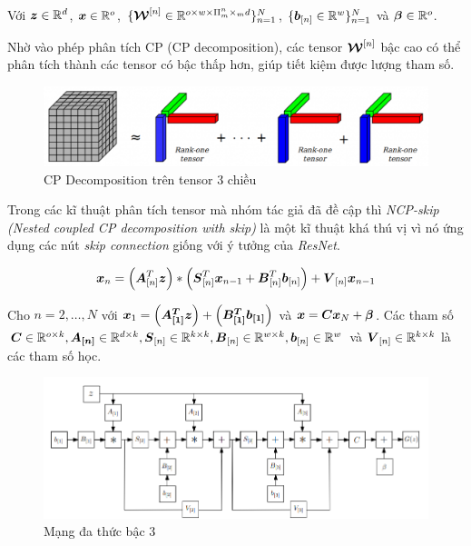 \documentclass[a4paper, 12pt]{article}
\begin{document}
Với $\vb*{z} \in \mathbb{R}^d$, $\vb*{x} \in \mathbb{R}^o$, $\{\vb*{\mathcal{W}}^{[n]} \in \mathbb{R}^{o \times w \times \Pi_m^n\times_m d}\}_{n=1}^N$, $\{\vb*{b}_{[n]} \in \mathbb{R}^{w}\}_{n=1}^{N}$ và $\vb*{\beta} \in \mathbb{R}^o$.

Nhờ vào phép phân tích CP (CP decomposition), các tensor $\vb*{\mathcal{W}}^{[n]}$ bậc cao có thể phân tích thành các tensor có bậc thấp hơn, giúp tiết kiệm được lượng tham số.

\begin{figure}[H]
    \begin{center}
        \includegraphics[scale=0.4]{img/cp-decomposition}
        \caption{CP Decomposition trên tensor 3 chiều}
    \end{center}
\end{figure}

Trong các kĩ thuật phân tích tensor mà nhóm tác giả đã đề cập thì \textit{NCP-skip (Nested coupled CP decomposition with skip)} là một kĩ thuật khá thú vị vì nó ứng dụng các nút \textit{skip connection} giống với ý tưởng của \textit{ResNet}. 

\begin{equation}
\vb*{x}_n = \left(\vb*{A}_{[n]}^{T}\vb*{z}\right) * \left(\vb*{S}_{[n]}^{T}\vb*{x}_{n-1} + \vb*{B}_{[n]}^{T}\vb*{b}_{[n]}\right) + \vb*{V}_{[n]}\vb*{x}_{n-1}
\end{equation}

Cho $n = 2,\dots,N$ với $\vb*{x}_1 = \left(\vb*{A_{[1]}^T\vb*{z}}\right) + \left(\vb*{B_{[1]}^T\vb*{b}_{[1]}}\right)$ và $\vb*{x} = \vb*{Cx}_N + \vb*{\beta}$. Các tham số $\vb*{C}\in\mathbb{R}^{o\times k}, \vb*{A_{[n]}} \in \mathbb{R}^{d \times k}, \vb*{S}_{[n]} \in \mathbb{R}^{k \times k}, \vb*{B}_{[n]} \in \mathbb{R}^{w \times k}, \vb*{b}_{[n]} \in \mathbb{R}^{w}$ và $\vb*{V}_{[n]} \in \mathbb{R}^{k \times k}$ là các tham số học.

\begin{figure}[H]
    \begin{center}
        \includegraphics[scale=0.4]{img/P-net-3rd-order}
        \caption{Mạng đa thức bậc 3}
    \end{center}
\end{figure}
\end{document}
